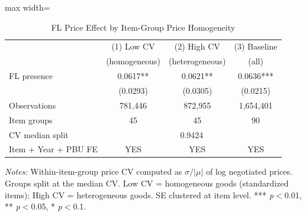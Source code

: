 \begin{table}[htbp]
\centering
\caption{FL Price Effect by Item-Group Price Homogeneity}
\label{tab:homogeneous_cv}
\begin{adjustbox}{max width=\textwidth}
\begin{threeparttable}
\small
\begin{tabular}{lccc}
\toprule
 & (1) Low CV & (2) High CV & (3) Baseline \\
 & (homogeneous) & (heterogeneous) & (all) \\
\midrule
FL presence & 0.0617** & 0.0621** & 0.0636*** \\
 & (0.0293) & (0.0305) & (0.0215) \\
\midrule
Observations & 781,446 & 872,955 & 1,654,401 \\
Item groups & 45 & 45 & 90 \\
CV median split & \multicolumn{3}{c}{0.9424} \\
Item + Year + PBU FE & YES & YES & YES \\
\bottomrule
\end{tabular}
\begin{tablenotes}
\small
\item \textit{Notes:} Within-item-group price CV computed as $\sigma / |\mu|$
of log negotiated prices. Groups split at the median CV.
Low CV = homogeneous goods (standardized items); High CV = heterogeneous goods.
SE clustered at item level.
*** \textit{p}$<$0.01, ** \textit{p}$<$0.05, * \textit{p}$<$0.1.
\end{tablenotes}
\end{threeparttable}
\end{adjustbox}
\end{table}
